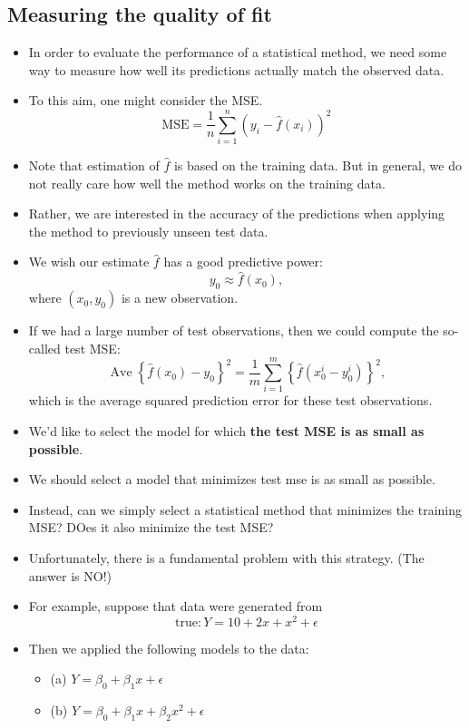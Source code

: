 \documentclass[11pt]{article}
\newcommand{\opn}{\operatorname}
\begin{document}
\subsection{Measuring the quality of fit}
\begin{itemize}
  \item In order to evaluate the performance of a statistical method, we need some way to measure how well its predictions actually match the observed data.
  \item To this aim, one might consider the MSE.
  $$
    \text{MSE} = \frac{1}{n}\sum_{i=1}^{n}\left(y_{i}-\hat{f}\left(x_{i}\right)\right)^{2}
  $$
  \item Note that estimation of $\hat{f}$ is based on the training data. But in general, we do not really care how well the method works on the training data.
  \item Rather, we are interested in the accuracy of the predictions when applying the method to previously unseen test data.
  \item We wish our estimate $\hat{f}$ has a good predictive power:
  $$
    y_{0}\approx \hat{f}\left(x_{0}\right),
  $$
  where $\left(x_{0},y_{0}\right)$ is a new observation.
  \item If we had a large number of test observations, then we could compute the so-called test MSE:
  $$
    \opn{Ave}\left\{\hat{f}\left(x_{0}\right)-y_{0} \right\}^{2} = \frac{1}{m}\sum_{i=1}^{m}\left\{\hat{f}\left(x_{0}^{i}-y_{0}^{i}\right) \right\}^{2},
  $$
  which is the average squared prediction error for these test observations.
  \item We'd like to select the model for which \textbf{the test MSE is as small as possible}.
  \item We should select a model that minimizes test mse is as small as possible.
  \item Instead, can we simply select a statistical method that minimizes the training MSE? DOes it also minimize the test MSE?
  \item Unfortunately, there is a fundamental problem with this strategy. (The answer is NO!)
  \item For example, suppose that data were generated from
  $$
    \text{true}: Y = 10 + 2x + x^{2} + \epsilon
  $$
  \item Then we applied the following models to the data:
  \begin{itemize}
    \item (a) $Y = \beta_{0}+\beta_{1}x + \epsilon $
    \item (b) $Y = \beta_{0} + \beta_{1}x + \beta_{2}x^{2} + \epsilon $

\end{itemize}
\end{itemize}
\end{document}
